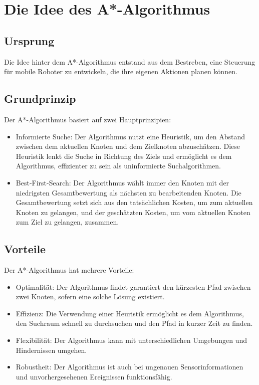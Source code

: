 \chapter{Die Idee des A*-Algorithmus}

\section{Ursprung}

Die Idee hinter dem A*-Algorithmus entstand aus dem Bestreben, eine Steuerung für mobile Roboter zu entwickeln, die ihre eigenen Aktionen planen können.



\section{Grundprinzip}

Der A*-Algorithmus basiert auf zwei Hauptprinzipien:

\begin{itemize}
\item Informierte Suche: Der Algorithmus nutzt eine Heuristik, um den Abstand zwischen dem aktuellen Knoten und dem Zielknoten abzuschätzen. Diese Heuristik lenkt die Suche in Richtung des Ziels und ermöglicht es dem Algorithmus, effizienter zu sein als uninformierte Suchalgorithmen.
\item Best-First-Search: Der Algorithmus wählt immer den Knoten mit der niedrigsten Gesamtbewertung als nächsten zu bearbeitenden Knoten. Die Gesamtbewertung setzt sich aus den tatsächlichen Kosten, um zum aktuellen Knoten zu gelangen, und der geschätzten Kosten, um vom aktuellen Knoten zum Ziel zu gelangen, zusammen.
\end{itemize}

\section{Vorteile}

Der A*-Algorithmus hat mehrere Vorteile:

\begin{itemize}
\item Optimalität: Der Algorithmus findet garantiert den kürzesten Pfad zwischen zwei Knoten, sofern eine solche Lösung existiert.
\item Effizienz: Die Verwendung einer Heuristik ermöglicht es dem Algorithmus, den Suchraum schnell zu durchsuchen und den Pfad in kurzer Zeit zu finden.
\item Flexibilität: Der Algorithmus kann mit unterschiedlichen Umgebungen und Hindernissen umgehen.
\item Robustheit: Der Algorithmus ist auch bei ungenauen Sensorinformationen und unvorhergesehenen Ereignissen funktionsfähig.
\end{itemize}

